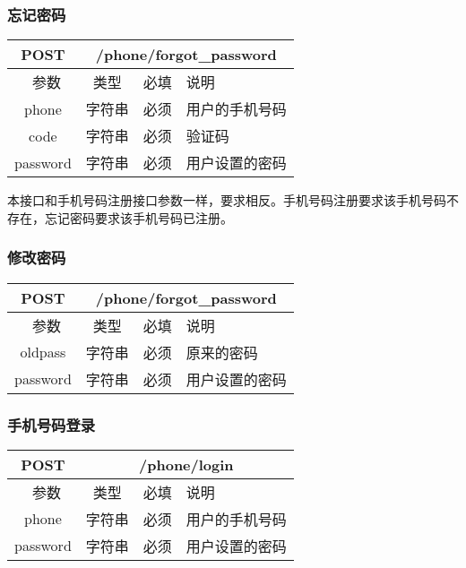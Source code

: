 \subsubsection{忘记密码}
\label{hash_algorithm}

\begin{table}[H]
   \begin{center}
\begin{tabular}{|c|c|c|p{12cm}|}
\hline
POST & \multicolumn{3}{|c|}{/phone/forgot\_password} \\
\hline\hline
 \  参数  & 类型 & 必填 &  说明  \\
\hline
 phone  & 字符串 & 必须 &  用户的手机号码\\
\hline
 code  & 字符串 & 必须 &  验证码\\
\hline
 password  & 字符串 & 必须 &  用户设置的密码\\
\hline
\end{tabular}
   \end{center}
\end{table}

本接口和手机号码注册接口参数一样，要求相反。手机号码注册要求该手机号码不存在，忘记密码要求该手机号码已注册。


\subsubsection{修改密码}
\label{hash_algorithm}

\begin{table}[H]
   \begin{center}
\begin{tabular}{|c|c|c|p{12cm}|}
\hline
POST & \multicolumn{3}{|c|}{/phone/forgot\_password} \\
\hline\hline
 \  参数  & 类型 & 必填 &  说明  \\
\hline
 oldpass  & 字符串 & 必须 &  原来的密码\\
\hline
 password  & 字符串 & 必须 &  用户设置的密码\\
\hline
\end{tabular}
   \end{center}
\end{table}



\subsubsection{手机号码登录}
\label{hash_algorithm}

\begin{table}[H]
   \begin{center}
\begin{tabular}{|c|c|c|p{12cm}|}
\hline
POST & \multicolumn{3}{|c|}{/phone/login} \\
\hline\hline
 \  参数  & 类型 & 必填 &  说明  \\
\hline
 phone  & 字符串 & 必须 &  用户的手机号码\\
\hline
 password  & 字符串 & 必须 &  用户设置的密码\\
\hline
\end{tabular}
   \end{center}
\end{table}

